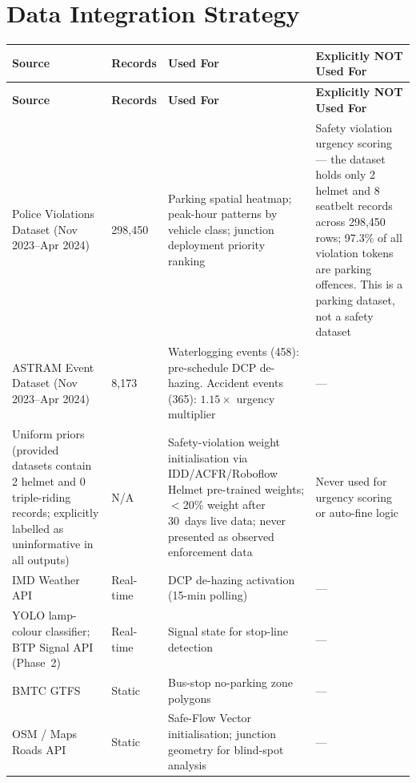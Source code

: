 \documentclass[11pt,a4paper]{article}
\begin{document}
\section{Data Integration Strategy}
\label{sec:data}
\begin{longtable}{L{3cm} C{1.8cm} L{4.5cm} L{5cm}}
    \toprule
    \color{white}\textbf{Source} & \color{white}\textbf{Records} & \color{white}\textbf{Used For} & \color{white}\textbf{Explicitly NOT Used For} \\
    \midrule
    \endfirsthead
    \toprule
    \color{white}\textbf{Source} & \color{white}\textbf{Records} & \color{white}\textbf{Used For} & \color{white}\textbf{Explicitly NOT Used For} \\
    \midrule
    \endhead
    \bottomrule
    \endfoot

    Police Violations Dataset (Nov 2023--Apr 2024) & 298,450 & Parking spatial heatmap; peak-hour patterns by vehicle class; junction deployment priority ranking & Safety violation urgency scoring --- the dataset holds only 2 helmet and 8 seatbelt records across 298,450 rows; 97.3\% of all violation tokens are parking offences. This is a parking dataset, not a safety dataset \\
    ASTRAM Event Dataset (Nov 2023--Apr 2024) & 8,173 & Waterlogging events (458): pre-schedule DCP de-hazing. Accident events (365): $1.15\times$ urgency multiplier & --- \\
    Uniform priors (provided datasets contain 2 helmet and 0 triple-riding records; explicitly labelled as uninformative in all outputs) & N/A & Safety-violation weight initialisation via IDD/ACFR/Roboflow Helmet pre-trained weights; $<$20\% weight after 30~days live data; never presented as observed enforcement data & Never used for urgency scoring or auto-fine logic \\
    IMD Weather API & Real-time & DCP de-hazing activation (15-min polling) & --- \\
    YOLO lamp-colour classifier; BTP Signal API (Phase~2) & Real-time & Signal state for stop-line detection & --- \\
    BMTC GTFS & Static & Bus-stop no-parking zone polygons & --- \\
    OSM / Maps Roads API & Static & Safe-Flow Vector initialisation; junction geometry for blind-spot analysis & --- \\
\end{longtable}
\end{document}
